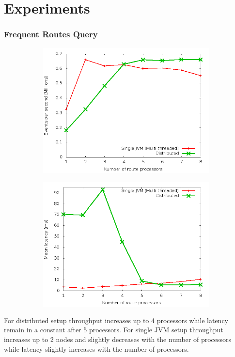 \documentclass[]{beamer}
\begin{document}
\section{Experiments}

\begin{frame}
\frametitle{Frequent Routes Query}

\begin{figure}
        \centering
        \begin{subfigure}[b]{0.45\textwidth}
                \includegraphics[width=\textwidth]{throughput_route.png}
        \end{subfigure}
        \begin{subfigure}[b]{0.45\textwidth}
                \includegraphics[width=\textwidth]{latency_route.png}
        \end{subfigure}
\end{figure}

\footnotesize For distributed setup throughput increases up to 4 processors while latency remain in a constant after 5 processors. For single JVM setup throughput increases up to 2 nodes and slightly decreases with the number of processors while latency slightly increases with the number of processors.
 

\end{frame}
\end{document}
